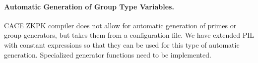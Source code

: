 \paragraph{Automatic Generation of Group Type Variables.}
CACE ZKPK compiler does not allow for automatic generation of primes
or group generators, but takes them from a configuration file. We have
extended PIL with constant expressions so that they can be used for
this type of automatic generation. Specialized generator functions
need to be implemented.



